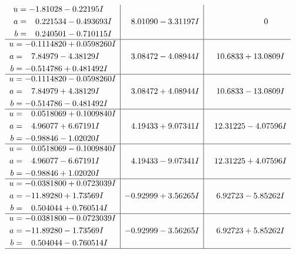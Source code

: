 \documentclass[1p]{elsarticle_modified}
\theoremstyle{definition}
\begin{document}
$$\begin{array}{c|c|c}
\begin{aligned}
u &= -1.81028 - 0.22195 I \\
a &= \phantom{-}0.221534 - 0.493693 I \\
b &= \phantom{-}0.240501 - 0.710115 I\end{aligned}
 & \phantom{-}8.01090 - 3.31197 I & \phantom{-0.000000 } 0 \\ \hline\begin{aligned}
u &= -0.1114820 + 0.0598260 I \\
a &= \phantom{-}7.84979 - 4.38129 I \\
b &= -0.514786 + 0.481492 I\end{aligned}
 & \phantom{-}3.08472 - 4.08944 I & \phantom{-}10.6833 + 13.0809 I \\ \hline\begin{aligned}
u &= -0.1114820 - 0.0598260 I \\
a &= \phantom{-}7.84979 + 4.38129 I \\
b &= -0.514786 - 0.481492 I\end{aligned}
 & \phantom{-}3.08472 + 4.08944 I & \phantom{-}10.6833 - 13.0809 I \\ \hline\begin{aligned}
u &= \phantom{-}0.0518069 + 0.1009840 I \\
a &= \phantom{-}4.96077 + 6.67191 I \\
b &= -0.98846 - 1.02020 I\end{aligned}
 & \phantom{-}4.19433 + 9.07341 I & \phantom{-}12.31225 - 4.07596 I \\ \hline\begin{aligned}
u &= \phantom{-}0.0518069 - 0.1009840 I \\
a &= \phantom{-}4.96077 - 6.67191 I \\
b &= -0.98846 + 1.02020 I\end{aligned}
 & \phantom{-}4.19433 - 9.07341 I & \phantom{-}12.31225 + 4.07596 I \\ \hline\begin{aligned}
u &= -0.0381800 + 0.0723039 I \\
a &= -11.89280 + 1.73569 I \\
b &= \phantom{-}0.504044 + 0.760514 I\end{aligned}
 & -0.92999 + 3.56265 I & \phantom{-}6.92723 - 5.85262 I \\ \hline\begin{aligned}
u &= -0.0381800 - 0.0723039 I \\
a &= -11.89280 - 1.73569 I \\
b &= \phantom{-}0.504044 - 0.760514 I\end{aligned}
 & -0.92999 - 3.56265 I & \phantom{-}6.92723 + 5.85262 I\\
 \hline 
 \end{array}$$\newpage\newpage\renewcommand{\arraystretch}{1}
\end{document}
